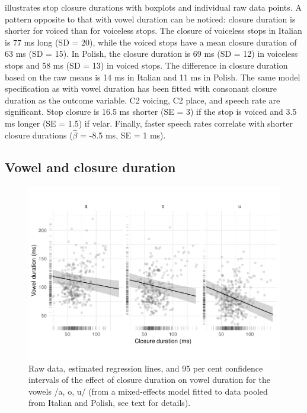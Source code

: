 \documentclass[12pt,]{article}
\begin{document}
 illustrates stop closure durations with boxplots and
individual raw data points. A pattern opposite to that with vowel
duration can be noticed: closure duration is shorter for voiced than for
voiceless stops. The closure of voiceless stops in Italian is 77 ms long
(SD = 20), while the voiced stops have a mean closure duration of 63 ms
(SD = 15). In Polish, the closure duration is 69 ms (SD = 12) in
voiceless stops and 58 ms (SD = 13) in voiced stops. The difference in
closure duration based on the raw means is 14 ms in Italian and 11 ms in
Polish. The same model specification as with vowel duration has been
fitted with consonant closure duration as the outcome variable. C2
voicing, C2 place, and speech rate are significant. Stop closure is 16.5
ms shorter (SE = 3) if the stop is voiced and 3.5 ms longer (SE = 1.5)
if velar. Finally, faster speech rates correlate with shorter closure
durations (\(\hat{\beta}\) = -8.5 ms, SE = 1 ms).

\hypertarget{vowel-and-closure-duration}{%
\subsection{Vowel and closure
duration}\label{vowel-and-closure-duration}}

\label{s:vcduration}

\begin{figure}
\includegraphics[width=\linewidth]{2018-relrel_files/figure-latex/Figure4} \caption{Raw data, estimated regression lines, and 95 per cent confidence intervals of the effect of closure duration on vowel duration for the vowels /a, o, u/ (from a mixed-effects model fitted to data pooled from Italian and Polish, see text for details).}\label{f:Figure4}
\end{figure}
\end{document}
